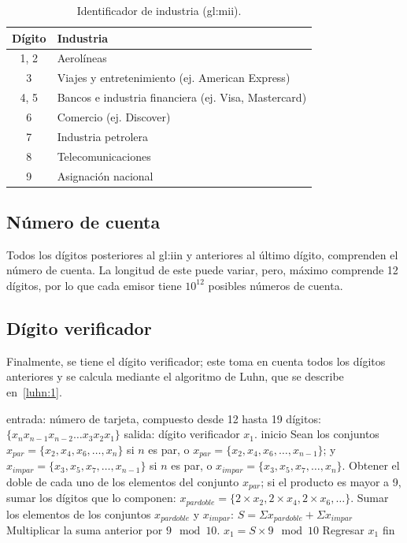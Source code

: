 \begin{table}[H]
  \centering
  \begin{tabular}{ c|l }
    Dígito & Industria \\ \hline
    1, 2 & Aerolíneas \\
    3 & Viajes y entretenimiento (ej. American Express) \\
    4, 5 &  Bancos e industria financiera (ej. Visa, Mastercard)\\
    6 & Comercio (ej. Discover) \\
    7 &  Industria petrolera \\
    8 &  Telecomunicaciones \\
    9 &  Asignación nacional \\
    \end{tabular}
    \caption{Identificador de industria (\gls{gl:mii}).}\label{tabla:mii}
\end{table}

\subsection{Número de cuenta}
Todos los dígitos posteriores al \gls{gl:iin} y anteriores al último dígito,
comprenden el número de cuenta. La longitud de este puede variar, pero, máximo
comprende 12 dígitos, por lo que cada emisor tiene $10^{12}$ posibles números
de cuenta.

\subsection{Dígito verificador}
Finalmente, se tiene el dígito verificador; este toma en cuenta todos los
dígitos anteriores y se calcula mediante el algoritmo de Luhn, que se describe
en~\ref{luhn:1}.

\begin{pseudocodigo}[%
    caption={Algoritmo de Luhn.},
    label={luhn:1}%
  ]
  entrada: número de tarjeta, compuesto desde 12 hasta 19 dígitos:
           $\{x_{n} x_{n-1} x_{n-2} \dots x_3 x_2 x_1\}$
  salida:  dígito verificador $x_1$.
  inicio
    Sean los conjuntos $x_{par} = \{x_2, x_4, x_6, \dots, x_n\}$ si $n$ es par, o $x_{par} = \{x_2, x_4, x_6, \dots, x_{n-1}\}$; y
                       $x_{impar} = \{x_3, x_5, x_7, \dots, x_{n-1}\}$ si $n$ es par, o $x_{impar} = \{x_3, x_5, x_7, \dots, x_n\}$.
    Obtener el doble de cada uno de los elementos del conjunto $x_{par}$; si
      el producto es mayor a 9, sumar los dígitos que lo componen:
      $x_{par doble} = \{2 \times x_2, 2 \times x_4, 2 \times x_6, \dots \}$.
    Sumar los elementos de los conjuntos $x_{par doble}$ y $x_{impar}$:
      $S = \Sigma x_{par doble} + \Sigma x_{impar}$
    Multiplicar la suma anterior por $9 \mod  10$.
      $x_1 = S \times 9 \mod 10$
    Regresar $x_1$
  fin
\end{pseudocodigo}
